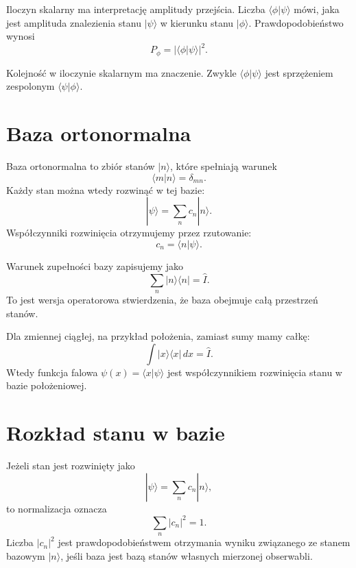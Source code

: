 Iloczyn skalarny ma interpretację amplitudy przejścia. Liczba \(\langle\phi|\psi\rangle\) mówi, jaka jest amplituda znalezienia stanu \(|\psi\rangle\) w kierunku stanu \(|\phi\rangle\). Prawdopodobieństwo wynosi
\begin{equation}
    P_{\phi}=|\langle\phi|\psi\rangle|^2.
\end{equation}

\begin{remarkbox}
Kolejność w iloczynie skalarnym ma znaczenie. Zwykle \(\langle\phi|\psi\rangle\) jest sprzężeniem zespolonym \(\langle\psi|\phi\rangle\).
\end{remarkbox}

\section{Baza ortonormalna}

Baza ortonormalna to zbiór stanów \(|n\rangle\), które spełniają warunek
\begin{equation}
    \langle m|n\rangle=\delta_{mn}.
\end{equation}
Każdy stan można wtedy rozwinąć w tej bazie:
\begin{equation}
    |\psi\rangle=\sum_n c_n|n\rangle.
\end{equation}
Współczynniki rozwinięcia otrzymujemy przez rzutowanie:
\begin{equation}
    c_n=\langle n|\psi\rangle.
\end{equation}

Warunek zupełności bazy zapisujemy jako
\begin{equation}
    \sum_n |n\rangle\langle n|=\hat{I}.
\end{equation}
To jest wersja operatorowa stwierdzenia, że baza obejmuje całą przestrzeń stanów.

Dla zmiennej ciągłej, na przykład położenia, zamiast sumy mamy całkę:
\begin{equation}
    \int |x\rangle\langle x|\,dx=\hat{I}.
\end{equation}
Wtedy funkcja falowa \(\psi(x)=\langle x|\psi\rangle\) jest współczynnikiem rozwinięcia stanu w bazie położeniowej.

\section{Rozkład stanu w bazie}

Jeżeli stan jest rozwinięty jako
\begin{equation}
    |\psi\rangle=\sum_n c_n|n\rangle,
\end{equation}
to normalizacja oznacza
\begin{equation}
    \sum_n |c_n|^2=1.
\end{equation}
Liczba \(|c_n|^2\) jest prawdopodobieństwem otrzymania wyniku związanego ze stanem bazowym \(|n\rangle\), jeśli baza jest bazą stanów własnych mierzonej obserwabli.

